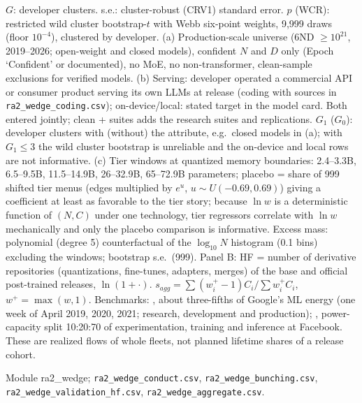 \begin{table}[tp]
\begin{tablenotes}$G$: developer clusters. s.e.: cluster-robust (CRV1) standard error. $p$ (WCR): restricted wild cluster bootstrap-$t$ with Webb six-point weights, 9,999 draws (floor $10^{-4}$), clustered by developer. (a) Production-scale universe (6ND $\ge10^{21}$, 2019--2026; open-weight and closed models), confident $N$ and $D$ only (Epoch `Confident' or documented), no MoE, no non-transformer, clean-sample exclusions for verified models. (b) Serving: developer operated a commercial API or consumer product serving its own LLMs at release (coding with sources in \texttt{ra2\_wedge\_coding.csv}); on-device/local: stated target in the model card. Both entered jointly; clean + suites adds the research suites and replications. $G_1$ ($G_0$): developer clusters with (without) the attribute, e.g.\ closed models in (a); with $G_1\le3$ the wild cluster bootstrap is unreliable \citep{mackinnon2018wild} and the on-device and local rows are not informative. (c) Tier windows at quantized memory boundaries: 2.4--3.3B, 6.5--9.5B, 11.5--14.9B, 26--32.9B, 65--72.9B parameters; placebo = share of 999 shifted tier menus (edges multiplied by $e^{u}$, $u\sim U(-0.69,0.69)$) giving a coefficient at least as favorable to the tier story; because $\ln w$ is a deterministic function of $(N,C)$ under one technology, tier regressors correlate with $\ln w$ mechanically and only the placebo comparison is informative. Excess mass: polynomial (degree 5) counterfactual of the $\log_{10}N$ histogram (0.1 bins) excluding the windows; bootstrap s.e.\ (999). Panel B: HF = number of derivative repositories (quantizations, fine-tunes, adapters, merges) of the base and official post-trained releases, $\ln(1+\cdot)$. $s_{agg}=\sum(w_i^+-1)C_i/\sum w_i^+C_i$, $w^+=\max(w,1)$. Benchmarks: \citet{patterson2022carbon}, about three-fifths of Google's ML energy (one week of April 2019, 2020, 2021; research, development and production); \citet{wu2022sustainable}, power-capacity split 10:20:70 of experimentation, training and inference at Facebook. These are realized flows of whole fleets, not planned lifetime shares of a release cohort.\end{tablenotes}
\begin{tablenotes}[Source]Module ra2\_wedge; \texttt{ra2\_wedge\_conduct.csv}, \texttt{ra2\_wedge\_bunching.csv}, \texttt{ra2\_wedge\_validation\_hf.csv}, \texttt{ra2\_wedge\_aggregate.csv}.\end{tablenotes}
\end{table}
